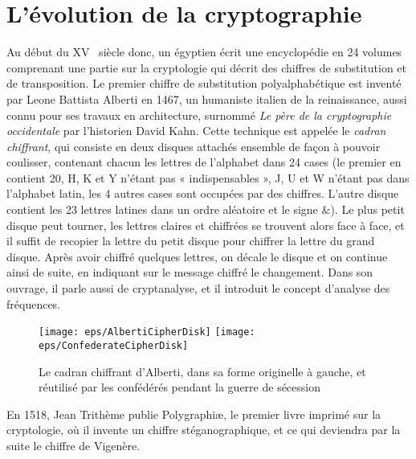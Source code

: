 \section{L'évolution de la cryptographie}
Au début du XV\ieme~ siècle donc, un égyptien écrit une encyclopédie
en 24 volumes comprenant une partie sur la cryptologie qui décrit des
chiffres de substitution et de transposition. Le premier chiffre de
substitution polyalphabétique
est inventé par Leone Battista Alberti en 1467, un humaniste italien
de la reinaissance, aussi connu pour ses travaux en architecture,
surnommé \emph{Le père de la cryptographie occidentale} par
l'historien David Kahn\cite{Codebreakers}. Cette technique est appelée
le \emph{cadran chiffrant}\label{syst:cadranchiffrant}, qui consiste
en deux disques attachés ensemble de façon à pouvoir coulisser,
contenant chacun les lettres de l'alphabet dans 24 cases (le premier
en contient 20, H, K et Y n'étant pas « indispensables », J, U et W
n'étant pas dans l'alphabet latin, les 4 autres cases sont occupées
par des chiffres. L'autre disque contient les 23 lettres latines dans
un ordre aléatoire et le signe \&). Le plus petit disque peut tourner,
les lettres claires et chiffrées se trouvent alors face à face, et il
suffit de recopier la lettre du petit disque pour chiffrer la lettre
du grand disque. Après avoir chiffré quelques lettres, on décale le
disque et on continue ainsi de suite, en indiquant sur le message
chiffré le changement. Dans son ouvrage, il parle aussi de
cryptanalyse, et il introduit le concept d'analyse des
fréquences. \\

\begin{figure}[h]
  \begin{center}
    \texttt{[image: eps/AlbertiCipherDisk]}
    \hspace{3cm}
    \texttt{[image: eps/ConfederateCipherDisk]}
  \end{center}
  \caption{Le cadran chiffrant d'Alberti, dans sa forme originelle à
    gauche, et réutilisé par les confédérés pendant la guerre de
    sécession}
  \label{fig:AlbertiCadranChiffrant}
\end{figure}

En 1518, Jean Trithème publie Polygraphi\ae , le premier livre imprimé
sur la cryptologie, où il invente un chiffre stéganographique, et ce
qui deviendra par la suite le chiffre de
Vigenère. \\

